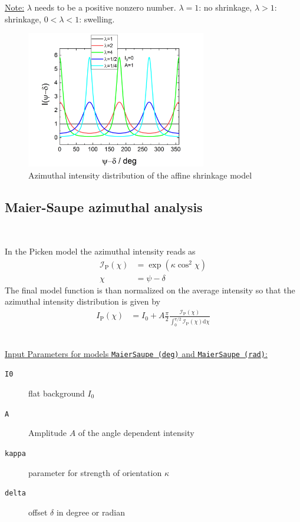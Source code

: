 \noindent \uline{Note:}
$\lambda$ needs to be a positive nonzero number. $\lambda=1$: no shrinkage, $\lambda>1$: shrinkage, $0<\lambda<1$: swelling.


\begin{figure}[htb]
\begin{center}
\includegraphics[width=0.7\textwidth]{../images/form_factor/azimuthal/affine_shrinkage.png}
\end{center}
\caption{Azimuthal intensity distribution of the affine shrinkage model}
\label{fig:affineshrinkage}
\end{figure}

\newpage
\subsection{Maier-Saupe azimuthal analysis} ~\\
\label{sec:Picken}

In the Picken model \cite{Picken1990,Fan1994,Makarova2013} the azimuthal intensity reads as
\begin{align}
  \mathcal{I}_\mathrm{P}(\chi) &= \exp\left(\kappa\cos^2\chi\right)\\
\chi &= \psi-\delta
\end{align}
The final model function is than normalized on the average intensity so that the azimuthal intensity distribution is given by
\begin{align}
  I_\mathrm{P}(\chi) &= I_0 + A \frac{\pi}{2}\frac{\mathcal{I}_\mathrm{P}(\chi)}{\int_0^{\pi/2}\mathcal{I}_\mathrm{P}(\chi)\mathrm{d}\chi}
\end{align}

\hspace{1pt}\\
\uline{Input Parameters for models \texttt{MaierSaupe (deg)} and \texttt{MaierSaupe (rad)}:}\\
\begin{description}
\item[\texttt{I0}] flat background $I_0$
\item[\texttt{A}] Amplitude $A$ of the angle dependent intensity
\item[\texttt{kappa}] parameter for strength of orientation $\kappa$
\item[\texttt{delta}] offset $\delta$ in degree or radian
\end{description}

